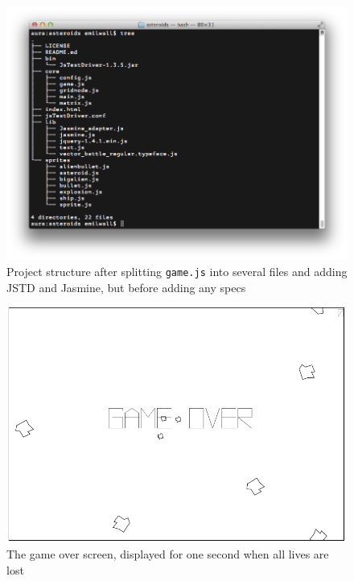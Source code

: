 \documentclass[11pt]{article}
\begin{document}
\begin{figure}[ht!]
\centering
\includegraphics[width=1.0\textwidth]{pics/tree.png}
\caption{Project structure after splitting \texttt{game.js} into several files and adding JSTD and Jasmine, but before adding any specs}
\label{fig:tree}
\end{figure}

\begin{figure}[h!]
\centering
\includegraphics[width=1.0\textwidth]{pics/game7.png}
\caption{The game over screen, displayed for one second when all lives are lost}
\label{fig:game7}
\end{figure}
\end{document}
